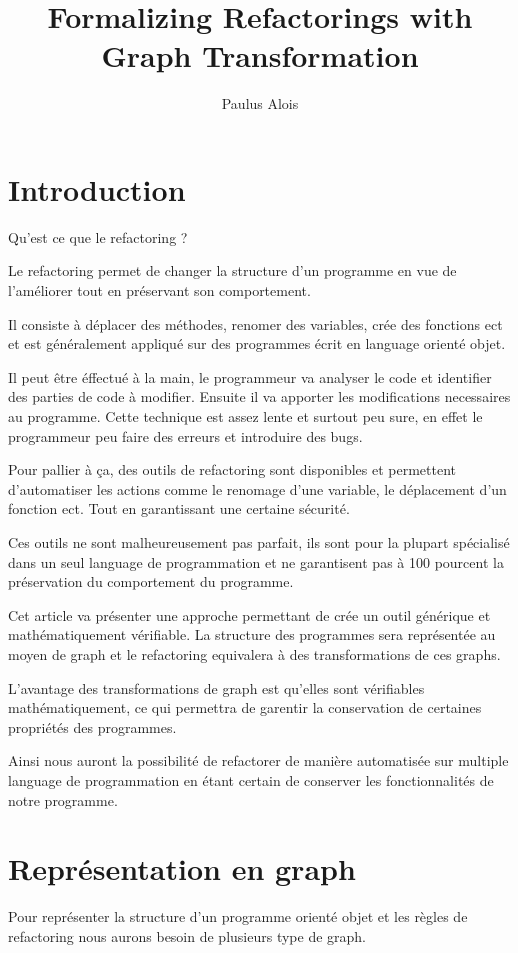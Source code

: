 \documentclass[a4paper, 12pt]{article}
\title{Formalizing Refactorings with Graph Transformation}
\author{Paulus Alois}
\begin{document}
\maketitle

\tableofcontents

\newpage

\section{Introduction}

Qu'est ce que le refactoring ? 

Le refactoring permet de changer la structure d'un programme en vue de l'améliorer tout en préservant son comportement. 

Il consiste à déplacer des méthodes, renomer des variables, crée des fonctions ect et est généralement appliqué sur des programmes écrit en language orienté objet. 

Il peut être éffectué à la main, le programmeur va analyser le code et identifier des parties de code à modifier. Ensuite il va apporter les modifications necessaires au programme.
Cette technique est assez lente et surtout peu sure, en effet le programmeur peu faire des erreurs et introduire des bugs.

Pour pallier à ça, des outils de refactoring sont disponibles et permettent d'automatiser les actions comme le renomage d'une variable, le déplacement d'un fonction ect. Tout en garantissant une certaine sécurité.

Ces outils ne sont malheureusement pas parfait, ils sont pour la plupart spécialisé dans un seul language de programmation et ne garantisent pas à 100 pourcent la préservation du comportement du programme.

Cet article va présenter une approche permettant de crée un outil générique et mathématiquement vérifiable. La structure des programmes sera représentée au moyen de graph et le refactoring equivalera à des transformations de ces graphs.

L'avantage des transformations de graph est qu'elles sont vérifiables mathématiquement, ce qui permettra de garentir la conservation de certaines propriétés des programmes.

Ainsi nous auront la possibilité de refactorer de manière automatisée sur multiple language de programmation en étant certain de conserver les fonctionnalités de notre programme.

\newpage 

\section{Représentation en graph}
Pour représenter la structure d'un programme orienté objet et les règles de refactoring nous aurons besoin de plusieurs type de graph.
\end{document}
